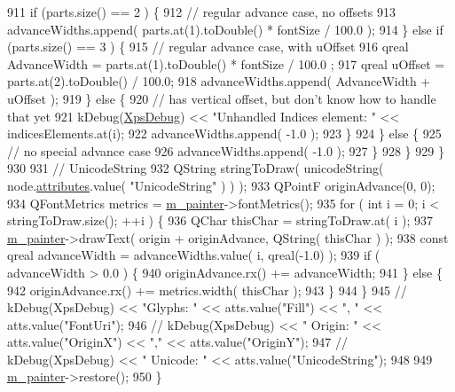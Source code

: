\begin{DoxyCode}
911                 \textcolor{keywordflow}{if} (parts.size() == 2 ) \{
912                     \textcolor{comment}{// regular advance case, no offsets}
913                     advanceWidths.append( parts.at(1).toDouble() * fontSize / 100.0 );
914                 \} \textcolor{keywordflow}{else} \textcolor{keywordflow}{if} (parts.size() == 3 ) \{
915                     \textcolor{comment}{// regular advance case, with uOffset}
916                     qreal AdvanceWidth = parts.at(1).toDouble() * fontSize / 100.0 ;
917                     qreal uOffset = parts.at(2).toDouble() / 100.0;
918                     advanceWidths.append( AdvanceWidth + uOffset );
919                 \} \textcolor{keywordflow}{else} \{
920                     \textcolor{comment}{// has vertical offset, but don't know how to handle that yet}
921                     kDebug(\hyperlink{generator__xps_8cpp_a00c0825a8bf77ed142d9a5a205d66f3c}{XpsDebug}) << \textcolor{stringliteral}{"Unhandled Indices element: "} << indicesElements.at(i);
922                     advanceWidths.append( -1.0 );
923                 \}
924             \} \textcolor{keywordflow}{else} \{
925                 \textcolor{comment}{// no special advance case}
926                 advanceWidths.append( -1.0 );
927             \}
928         \}
929     \}
930 
931     \textcolor{comment}{// UnicodeString}
932     QString stringToDraw( unicodeString( node.\hyperlink{classXpsRenderNode_a7f6fca2e06dd119e7eb20139af6c8477}{attributes}.value( \textcolor{stringliteral}{"UnicodeString"} ) ) );
933     QPointF originAdvance(0, 0);
934     QFontMetrics metrics = \hyperlink{classXpsHandler_a2db77df5312274e6f1d7e274b45c9d21}{m\_painter}->fontMetrics();
935     \textcolor{keywordflow}{for} ( \textcolor{keywordtype}{int} i = 0; i < stringToDraw.size(); ++i ) \{
936         QChar thisChar = stringToDraw.at( i );
937         \hyperlink{classXpsHandler_a2db77df5312274e6f1d7e274b45c9d21}{m\_painter}->drawText( origin + originAdvance, QString( thisChar ) );
938     \textcolor{keyword}{const} qreal advanceWidth = advanceWidths.value( i, qreal(-1.0) );
939         \textcolor{keywordflow}{if} ( advanceWidth > 0.0 ) \{
940             originAdvance.rx() += advanceWidth;
941         \} \textcolor{keywordflow}{else} \{
942             originAdvance.rx() += metrics.width( thisChar );
943         \}
944     \}
945     \textcolor{comment}{// kDebug(XpsDebug) << "Glyphs: " << atts.value("Fill") << ", " << atts.value("FontUri");}
946     \textcolor{comment}{// kDebug(XpsDebug) << "    Origin: " << atts.value("OriginX") << "," << atts.value("OriginY");}
947     \textcolor{comment}{// kDebug(XpsDebug) << "    Unicode: " << atts.value("UnicodeString");}
948 
949     \hyperlink{classXpsHandler_a2db77df5312274e6f1d7e274b45c9d21}{m\_painter}->restore();
950 \}
\end{DoxyCode}
